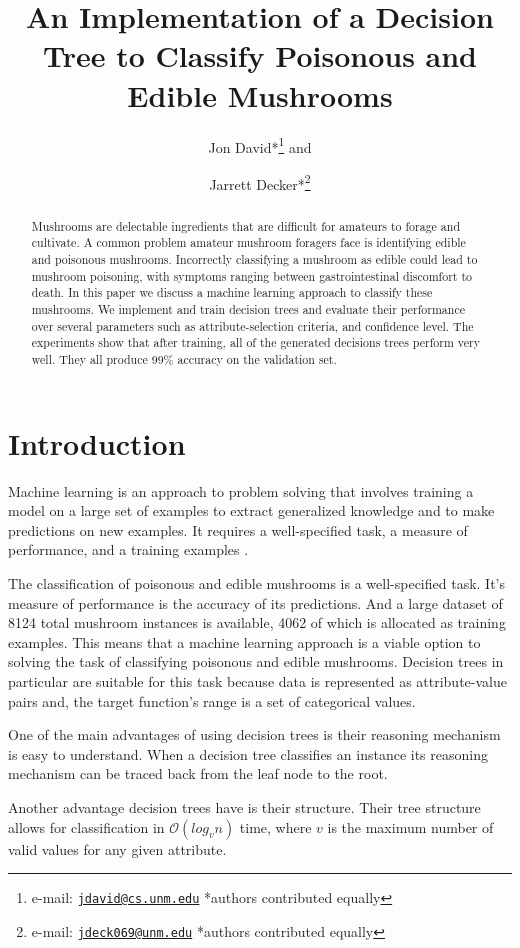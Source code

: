 \documentclass{IEEEtran}
\author{Jon David*\thanks{e-mail:
    \href{mailto:jdavid@cs.unm.edu}
         {\texttt{jdavid@cs.unm.edu}}
         {*authors contributed equally}} and
\and
       Jarrett Decker*\thanks{e-mail:
    \href{mailto:p.s.ortegel@gmail.com}
         {\texttt{jdeck069@unm.edu}}
         {*authors contributed equally}}}
\title{An Implementation of a Decision Tree to Classify Poisonous and
  Edible Mushrooms}
\begin{document}
\maketitle

\begin{abstract}

Mushrooms are delectable ingredients that are difficult for amateurs
to forage and cultivate. A common problem amateur mushroom foragers
face is identifying edible and poisonous mushrooms. Incorrectly
classifying a mushroom as edible could lead to mushroom poisoning,
with symptoms ranging between gastrointestinal discomfort to death. In
this paper we discuss a machine learning approach to classify these
mushrooms. We implement and train decision trees and evaluate their
performance over several parameters such as attribute-selection
criteria, and confidence level. The experiments show that after
training, all of the generated decisions trees perform very well. They
all produce 99\% accuracy on the validation set.

\end{abstract}

\section{Introduction}
Machine learning is an approach to problem solving that involves
training a model on a large set of examples to extract generalized
knowledge and to make predictions on new examples. It requires a
well-specified task, a measure of performance, and a training
examples \parencite{mitchell1997machine}.

The classification of poisonous and edible mushrooms is a
well-specified task. It's measure of performance is the accuracy of
its predictions. And a large dataset of 8124 total mushroom instances is
available, 4062 of which is allocated as training examples. This means that
a machine learning approach is a viable option to solving the task of
classifying poisonous and edible mushrooms. Decision trees in
particular are suitable for this task \parencite{mitchell1997machine}
because  data is represented as attribute-value pairs and, the target
function's range is a set of categorical values.

One of the main advantages of using decision trees is their reasoning
mechanism is easy to understand. When a decision tree classifies an
instance its reasoning mechanism can be traced back from the leaf node
to the root.

Another advantage decision trees have is their structure. Their tree
structure allows for classification in $\mathcal{O}(log_{v}n)$ time,
where $v$ is the maximum number of valid values for any given attribute.
\end{document}
